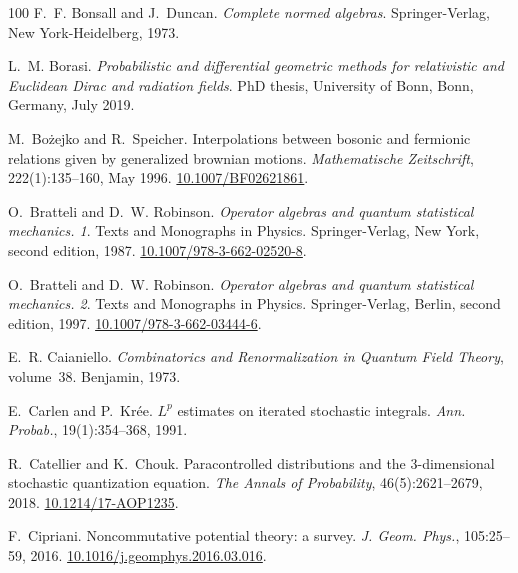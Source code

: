 \documentclass[11pt]{article}
\newcommand{\tmtextit}[1]{{\itshape{#1}}}
\begin{document}
\begin{thebibliography}{100}
  F.~F. Bonsall and J.~Duncan.
  {\newblock}\tmtextit{Complete normed algebras}. {\newblock}Springer-Verlag,
  New York-Heidelberg, 1973.
  
  L.~M. Borasi. {\newblock}\tmtextit{Probabilistic and
  differential geometric methods for relativistic and Euclidean Dirac and
  radiation fields}. {\newblock}PhD thesis, University of Bonn, Bonn, Germany,
  July 2019.
  
  M.~Bo{\.z}ejko and R.~Speicher.
  {\newblock}Interpolations between bosonic and fermionic relations given by
  generalized brownian motions. {\newblock}\tmtextit{Mathematische
  Zeitschrift}, 222(1):135--160, May 1996.
  {\newblock}\href{https://doi.org/10.1007/BF02621861}{10.1007/BF02621861}.
  
  O.~Bratteli and D.~W. Robinson.
  {\newblock}\tmtextit{Operator algebras and quantum statistical mechanics.
  1}. {\newblock}Texts and Monographs in Physics. Springer-Verlag, New York,
  second edition, 1987. {\newblock}
  \href{https://doi.org/10.1007/978-3-662-02520-8}{10.1007/978-3-662-02520-8}.
  
  O.~Bratteli and D.~W. Robinson.
  {\newblock}\tmtextit{Operator algebras and quantum statistical mechanics.
  2}. {\newblock}Texts and Monographs in Physics. Springer-Verlag, Berlin,
  second edition, 1997. {\newblock}
  \href{https://doi.org/10.1007/978-3-662-03444-6}{10.1007/978-3-662-03444-6}.
  
  E.~R. Caianiello.
  {\newblock}\tmtextit{Combinatorics and Renormalization in Quantum Field
  Theory}, volume~38. {\newblock}Benjamin, 1973.
  
  E.~Carlen and P.~Kr{\'e}e. {\newblock}$L^p$ estimates
  on iterated stochastic integrals. {\newblock}\tmtextit{Ann. Probab.},
  19(1):354--368, 1991.
  
  R.~Catellier and K.~Chouk.
  {\newblock}Paracontrolled distributions and the 3-dimensional stochastic
  quantization equation. {\newblock}\tmtextit{The Annals of Probability},
  46(5):2621--2679, 2018.
  {\newblock}\href{https://doi.org/10.1214/17-AOP1235}{10.1214/17-AOP1235}.
  
  F.~Cipriani. {\newblock}Noncommutative potential
  theory: a survey. {\newblock}\tmtextit{J. Geom. Phys.}, 105:25--59, 2016.
  {\newblock}
  \href{https://doi.org/10.1016/j.geomphys.2016.03.016}{10.1016/j.geomphys.2016.03.016}.
  

\end{thebibliography}
\end{document}
